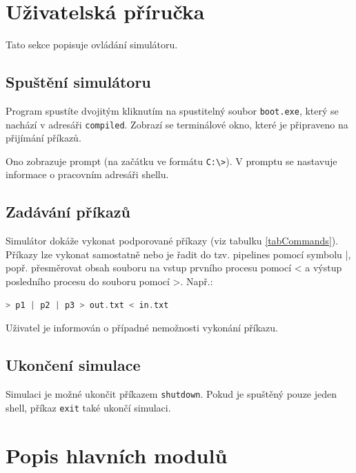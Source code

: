 \documentclass[12pt, a4paper]{article}
\let\oldsection\section
\renewcommand\section{\clearpage\oldsection}
\begin{document}
		
	
    
   
    
    
    
    \section{Uživatelská příručka}
	Tato sekce popisuje ovládání simulátoru.    
    
    \subsection{Spuštění simulátoru}
Program spustíte dvojitým kliknutím na spustitelný soubor \texttt{boot.exe}, který se nachází v adresáři \texttt{compiled}. Zobrazí se terminálové okno, které je připraveno na přijímání příkazů.    

Ono zobrazuje prompt (na začátku ve formátu \texttt{C:\textbackslash>}). V promptu se nastavuje informace o pracovním adresáři shellu.
    
    \subsection{Zadávání příkazů}
	Simulátor dokáže vykonat podporované příkazy (viz tabulku \ref{tabCommands}). Příkazy lze vykonat samostatně nebo je řadit do tzv. pipelines pomocí symbolu |, popř. přesměrovat obsah souboru na vstup prvního procesu pomocí < a výstup posledního procesu do souboru pomocí >.
	Např.:    
	\begin{lstlisting}[language=C, caption={Příklad pipeline},captionpos=b]
    > p1 | p2 | p3 > out.txt < in.txt
    \end{lstlisting}
    
    Uživatel je informován o případné nemožnosti vykonání příkazu.
    
    
    \subsection{Ukončení simulace}
    Simulaci je možné ukončit příkazem \texttt{shutdown}. Pokud je spuštěný pouze jeden shell, příkaz \texttt{exit} také ukončí simulaci.
    
    

    \section{Popis hlavních modulů}
\end{document}
